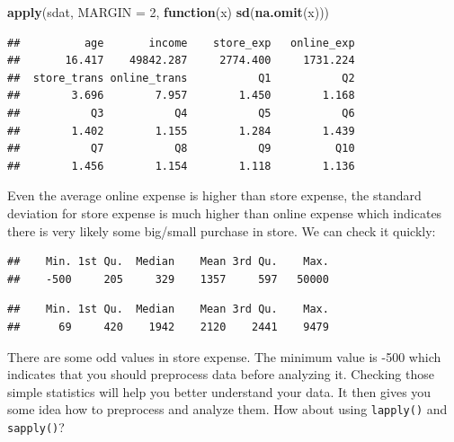 \documentclass[12pt,]{krantz}
\makeatletter
\newenvironment{Shaded}{\begin{snugshade}}{\end{snugshade}}
\newcommand{\ControlFlowTok}[1]{\textcolor[rgb]{0.27,0.27,0.27}{\textbf{#1}}}
\newcommand{\DataTypeTok}[1]{\textcolor[rgb]{0.27,0.27,0.27}{#1}}
\newcommand{\DecValTok}[1]{\textcolor[rgb]{0.06,0.06,0.06}{#1}}
\newcommand{\KeywordTok}[1]{\textcolor[rgb]{0.27,0.27,0.27}{\textbf{#1}}}
\newcommand{\NormalTok}[1]{#1}
\newcommand{\OperatorTok}[1]{\textcolor[rgb]{0.43,0.43,0.43}{\textbf{#1}}}
\newenvironment{kframe}{%
\medskip{}
\setlength{\fboxsep}{.8em}
 \def\at@end@of@kframe{}%
 \ifinner\ifhmode%
  \def\at@end@of@kframe{\end{minipage}}%
  \begin{minipage}{\columnwidth}%
 \fi\fi%
 \def\FrameCommand##1{\hskip\@totalleftmargin \hskip-\fboxsep
 \colorbox{shadecolor}{##1}\hskip-\fboxsep
     \hskip-\linewidth \hskip-\@totalleftmargin \hskip\columnwidth}%
 \MakeFramed {\advance\hsize-\width
   \@totalleftmargin\z@ \linewidth\hsize
   \@setminipage}}%
 {\par\unskip\endMakeFramed%
 \at@end@of@kframe}
\renewenvironment{Shaded}{\begin{kframe}}{\end{kframe}}
\makeatother
\begin{document}
\begin{Shaded}
\begin{Highlighting}[]
\KeywordTok{apply}\NormalTok{(sdat, }\DataTypeTok{MARGIN =} \DecValTok{2}\NormalTok{, }\ControlFlowTok{function}\NormalTok{(x) }\KeywordTok{sd}\NormalTok{(}\KeywordTok{na.omit}\NormalTok{(x)))}
\end{Highlighting}
\end{Shaded}

\begin{verbatim}
##          age       income    store_exp   online_exp 
##       16.417    49842.287     2774.400     1731.224 
##  store_trans online_trans           Q1           Q2 
##        3.696        7.957        1.450        1.168 
##           Q3           Q4           Q5           Q6 
##        1.402        1.155        1.284        1.439 
##           Q7           Q8           Q9          Q10 
##        1.456        1.154        1.118        1.136
\end{verbatim}

Even the average online expense is higher than store expense, the standard deviation for store expense is much higher than online expense which indicates there is very likely some big/small purchase in store. We can check it quickly:

\begin{Shaded}
\end{Shaded}

\begin{verbatim}
##    Min. 1st Qu.  Median    Mean 3rd Qu.    Max. 
##    -500     205     329    1357     597   50000
\end{verbatim}

\begin{Shaded}
\end{Shaded}

\begin{verbatim}
##    Min. 1st Qu.  Median    Mean 3rd Qu.    Max. 
##      69     420    1942    2120    2441    9479
\end{verbatim}

There are some odd values in store expense. The minimum value is -500 which indicates that you should preprocess data before analyzing it. Checking those simple statistics will help you better understand your data. It then gives you some idea how to preprocess and analyze them. How about using \texttt{lapply()} and \texttt{sapply()}?
\end{document}
